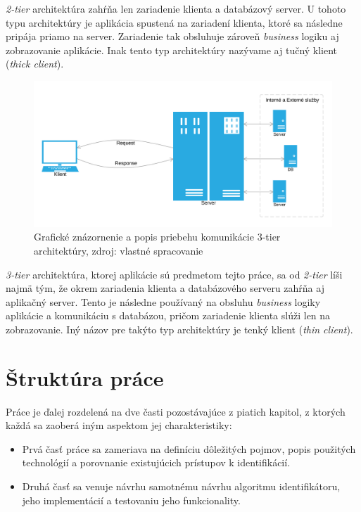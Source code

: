 \documentclass[
  digital, %
  table,   %
  lof,     %
  nolot,   %
  nocover
]{fithesis3}
\begin{document}
\textit{2-tier} architektúra zahŕňa len zariadenie klienta a databázový server.
U tohoto typu architektúry je aplikácia spustená na zariadení klienta, ktoré sa
následne pripája priamo na server. Zariadenie tak obsluhuje zároveň
\textit{business} logiku aj zobrazovanie aplikácie. Inak tento typ architektúry
nazývame aj tučný klient (\textit{thick client}).

\begin{figure}[H]
  \centering
    \includegraphics[width=\textwidth]{images/C-S-thin.png}
  \caption{Grafické znázornenie a popis priebehu komunikácie 3-tier architektúry,
  zdroj: vlastné spracovanie}
  \label{fig:cs-thin}
\end{figure}

\textit{3-tier} architektúra, ktorej aplikácie sú predmetom tejto práce, sa od
\textit{2-tier} líši najmä tým, že okrem zariadenia klienta a databázového serveru
zahŕňa aj aplikačný server. Tento je následne používaný na obsluhu
\textit{business} logiky aplikácie a komunikáciu s databázou, pričom zariadenie
klienta slúži len na zobrazovanie. Iný názov pre takýto typ architektúry je tenký
klient (\textit{thin client}).

\section{Štruktúra práce}
Práce je ďalej rozdelená na dve časti pozostávajúce z piatich kapitol, z ktorých každá sa zaoberá iným aspektom
jej charakteristiky:
\begin{itemize}
\item Prvá časť práce sa zameriava na
definíciu dôležitých pojmov, popis použitých technológií a porovnanie existujúcich prístupov k identifikácií.
\item Druhá časť sa venuje návrhu samotnému návrhu algoritmu identifikátoru, jeho implementácií a testovaniu jeho funkcionality.
\end{itemize}
\end{document}
